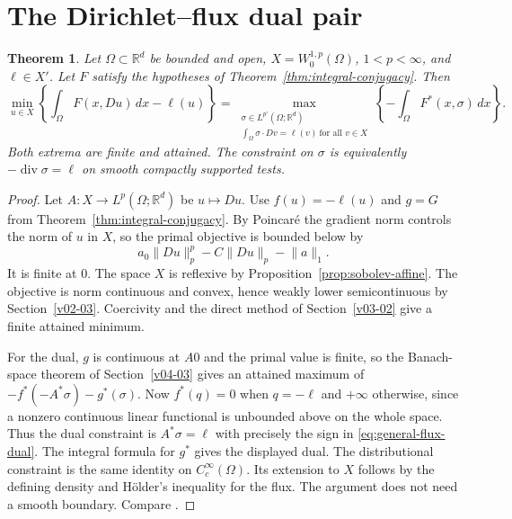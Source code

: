 \documentclass[11pt,oneside,openany]{book}
\newcommand{\R}{\mathbb R}
\newcommand{\norm}[1]{\lVert #1\rVert}
\theoremstyle{plain}
\newtheorem{theorem}{Theorem}[chapter]
\theoremstyle{definition}
\theoremstyle{remark}
\begin{document}
\section{The Dirichlet--flux dual pair}
\label{v09-02}

\begin{theorem}\label{thm:dirichlet-flux}
Let \(\Omega\subset\R^d\) be bounded and open,
\(X=W^{1,p}_0(\Omega)\), \(1<p<\infty\), and \(\ell\in X'\).
Let \(F\) satisfy the hypotheses of Theorem~\ref{thm:integral-conjugacy}.
Then
\begin{equation}\label{eq:general-flux-dual}
 \min_{u\in X}\left\{\int_\Omega F(x,Du)\,dx-\ell(u)\right\}
  =\max_{\substack{\sigma\in L^{p'}(\Omega;\R^d)\\
                    \int_\Omega \sigma\cdot Dv=\ell(v)
                         \ \text{for all }v\in X}}
           \left\{-\int_\Omega F^*(x,\sigma)\,dx\right\}.
\end{equation}
Both extrema are finite and attained. The constraint on
\(\sigma\) is equivalently
\(-\operatorname{div}\sigma=\ell\) on smooth compactly
supported tests.
\end{theorem}

\begin{proof}
Let \(A:X\to L^p(\Omega;\R^d)\) be \(u\mapsto Du\).
Use \(f(u)=-\ell(u)\) and \(g=G\) from
Theorem~\ref{thm:integral-conjugacy}. By Poincar\'e the
gradient norm controls the norm of \(u\) in \(X\), so the
primal objective is bounded below by
\[
 a_0\norm{Du}_p^p-C\norm{Du}_p-\norm{a}_1 .
\]
It is finite at \(0\). The space \(X\) is reflexive by
Proposition~\ref{prop:sobolev-affine}. The objective is norm
continuous and convex, hence weakly lower semicontinuous
by Section~\ref{v02-03}. Coercivity and the direct method
of Section~\ref{v03-02} give a finite attained minimum.

For the dual, \(g\) is continuous at \(A0\) and the primal
value is finite, so the Banach-space theorem of
Section~\ref{v04-03} gives an attained maximum of
\(-f^*(-A^*\sigma)-g^*(\sigma)\).
Now \(f^*(q)=0\) when \(q=-\ell\) and \(+\infty\) otherwise,
since a nonzero continuous linear functional is unbounded
above on the whole space. Thus the dual constraint is
\(A^*\sigma=\ell\) with precisely the sign in
\eqref{eq:general-flux-dual}. The integral formula for \(g^*\)
gives the displayed dual. The distributional constraint is
the same identity on \(C^\infty_c(\Omega)\). Its extension
to \(X\) follows by the defining density and H\"older's
inequality for the flux. The argument does not need a
smooth boundary.
Compare \cite[Chapter III, Theorems 4.1--4.2, and Chapter IV]{EkelandTemam}.
\end{proof}
\end{document}
